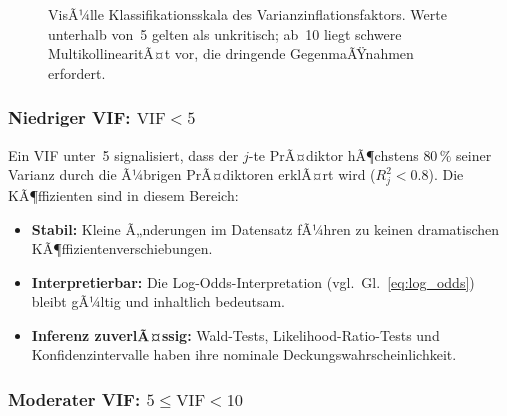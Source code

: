 ﻿\documentclass[12pt, a4paper]{article}
\theoremstyle{definition}
\theoremstyle{remark}
\begin{document}
\begin{figure}[H]
	\centering
	\caption{VisÃ¼lle Klassifikationsskala des Varianzinflationsfaktors. 
		Werte unterhalb von~5 gelten als unkritisch; ab~10 liegt schwere 
		MultikollinearitÃ¤t vor, die dringende GegenmaÃŸnahmen erfordert.}
	\label{fig:vif_scale}
\end{figure}

\subsubsection{Niedriger VIF: $\mathrm{VIF} < 5$}

Ein VIF unter~5 signalisiert, dass der $j$-te PrÃ¤diktor hÃ¶chstens $80\,\%$ seiner Varianz
durch die Ã¼brigen PrÃ¤diktoren erklÃ¤rt wird ($R_j^2 < 0.8$). Die KÃ¶ffizienten sind in diesem
Bereich:
\begin{itemize}
	\item \textbf{Stabil:} Kleine Ã„nderungen im Datensatz fÃ¼hren zu keinen dramatischen
	KÃ¶ffizientenverschiebungen.
	\item \textbf{Interpretierbar:} Die Log-Odds-Interpretation (vgl.~Gl.~\eqref{eq:log_odds})
	bleibt gÃ¼ltig und inhaltlich bedeutsam.
	\item \textbf{Inferenz zuverlÃ¤ssig:} Wald-Tests, Likelihood-Ratio-Tests und Konfidenzintervalle
	haben ihre nominale Deckungswahrscheinlichkeit.
\end{itemize}

\subsubsection{Moderater VIF: $5 \leq \mathrm{VIF} < 10$}
\end{document}
